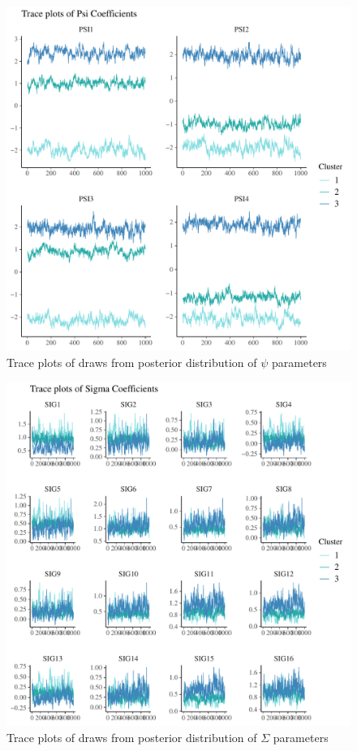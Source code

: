 \documentclass{article}
\begin{document}
\begin{figure}
	\label{fig:sim1_psi_trace}
	\caption{Trace plots of draws from posterior distribution of $\psi$ parameters}
	\centering
	\includegraphics[width = 1\textwidth]{psi_trace.pdf}
\end{figure}	

\begin{figure}
	\label{fig:sim1_sig2_trace}
	\caption{Trace plots of draws from posterior distribution of $\Sigma$ parameters}
	\centering
	\includegraphics[width = 1\textwidth]{sigma_trace.pdf}
\end{figure}	
\end{document}
